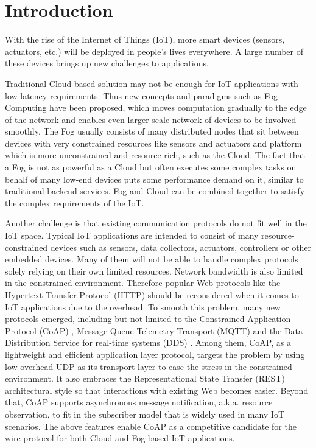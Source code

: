 \chapter{Introduction}\label{ch1}

With the rise of the Internet of Things (IoT), more smart devices (sensors, actuators, etc.) will be deployed in people's lives everywhere. A large number of these devices brings up new challenges to applications. 

Traditional Cloud-based solution may not be enough for IoT applications with low-latency requirements. Thus new concepts and paradigms such as Fog Computing have been proposed, which moves computation gradually to the edge of the network and enables even larger scale network of devices to be involved smoothly. The Fog usually consists of many distributed nodes that sit between devices with very constrained resources like sensors and actuators and platform which is more unconstrained and resource-rich, such as the Cloud. The fact that a Fog is not as powerful as a Cloud but often executes some complex tasks on behalf of many low-end devices puts some performance demand on it, similar to traditional backend services. Fog and Cloud can be combined together to satisfy the complex requirements of the IoT.

Another challenge is that existing communication protocols do not fit well in the IoT space. Typical IoT applications are intended to consist of many resource-constrained devices such as sensors, data collectors, actuators, controllers or other embedded devices. Many of them will not be able to handle complex protocols solely relying on their own limited resources. Network bandwidth is also limited in the constrained environment. Therefore popular Web protocols like the Hypertext Transfer Protocol (HTTP) should be reconsidered when it comes to IoT applications due to the overhead. To smooth this problem, many new protocols emerged, including but not limited to the Constrained Application Protocol (CoAP) \autocite{coap_protocol}, Message Queue Telemetry Transport (MQTT) \autocite{mqtt_protocol} and the Data Distribution Service for real-time systems (DDS) \autocite{dds}. Among them, CoAP, as a lightweight and efficient application layer protocol, targets the problem by using low-overhead UDP as its transport layer to ease the stress in the constrained environment. It also embraces the Representational State Transfer (REST) \autocite{fielding2000architectural} architectural style so that interactions with existing Web becomes easier. Beyond that, CoAP supports asynchronous message notification, a.k.a. resource observation, to fit in the subscriber model that is widely used in many IoT scenarios. The above features enable CoAP as a competitive candidate for the wire protocol for both Cloud and Fog based IoT applications.

